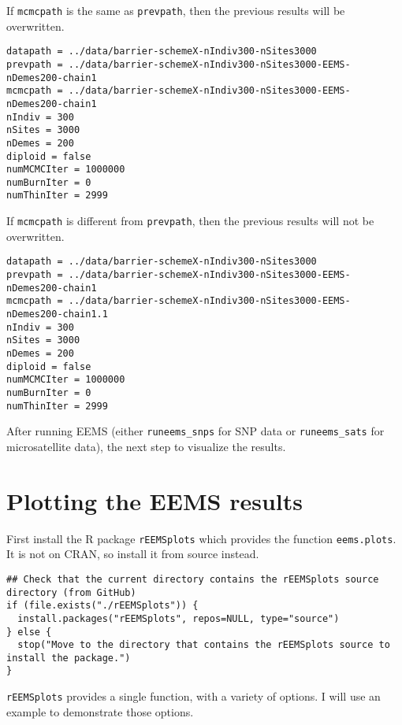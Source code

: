 \documentclass[a4paper,10pt,DIV=15,titlepage,mpinclude=true]{scrartcl}
\newcommand{\keystring}[1]{{\tt #1}}
\begin{document}
If \keystring{mcmcpath} is the same as \keystring{prevpath}, then the previous results will be overwritten.

\begin{lstlisting}[style=Cppcode]
datapath = ../data/barrier-schemeX-nIndiv300-nSites3000
prevpath = ../data/barrier-schemeX-nIndiv300-nSites3000-EEMS-nDemes200-chain1
mcmcpath = ../data/barrier-schemeX-nIndiv300-nSites3000-EEMS-nDemes200-chain1
nIndiv = 300
nSites = 3000
nDemes = 200
diploid = false
numMCMCIter = 1000000
numBurnIter = 0
numThinIter = 2999
\end{lstlisting}

If \keystring{mcmcpath} is different from \keystring{prevpath}, then the previous results will not be overwritten.

\begin{lstlisting}[style=Cppcode]
datapath = ../data/barrier-schemeX-nIndiv300-nSites3000
prevpath = ../data/barrier-schemeX-nIndiv300-nSites3000-EEMS-nDemes200-chain1
mcmcpath = ../data/barrier-schemeX-nIndiv300-nSites3000-EEMS-nDemes200-chain1.1
nIndiv = 300
nSites = 3000
nDemes = 200
diploid = false
numMCMCIter = 1000000
numBurnIter = 0
numThinIter = 2999
\end{lstlisting}

After running EEMS (either \keystring{runeems\_snps} for SNP data or \keystring{runeems\_sats} for microsatellite data), the next step to visualize the results.

\newpage

\section{Plotting the EEMS results}\label{sec:plotting-eems}

First install the R package \keystring{rEEMSplots} which provides the function \keystring{eems.plots}. It is not on CRAN, so install it from source instead.

\begin{lstlisting}[style=Rcode]
## Check that the current directory contains the rEEMSplots source directory (from GitHub)
if (file.exists("./rEEMSplots")) {
  install.packages("rEEMSplots", repos=NULL, type="source")
} else {
  stop("Move to the directory that contains the rEEMSplots source to install the package.")
}
\end{lstlisting}

\keystring{rEEMSplots} provides a single function, with a variety of options. I will use an example to demonstrate those options.
\end{document}
